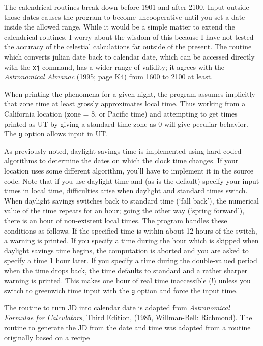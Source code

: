 The calendrical routines break down before 1901 and after 2100. Input 
outside those dates causes the program to become uncooperative until you 
set a date inside the allowed range.  While it would be a simple matter 
to extend the calendrical routines, I worry about the wisdom of this 
because I have not tested the accuracy of the celestial calculations far 
outside of the present.  The routine which converts julian date
back to calendar date, which can be accessed directly with the {\tt xj}
command, has a wider range of validity; it agrees with the {\it Astronomical
Almanac} (1995; page K4) from 1600 to 2100 at least.
\par
When printing the phenomena for a given night, the program assumes 
implicitly that zone time at least grossly approximates 
local time.  Thus working from a California location (zone = 8, or 
Pacific time) and attempting to get times printed as UT by giving a 
standard time zone as 0 will give peculiar behavior.  The {\tt g} option 
allows input in UT.
\par
As previously noted, daylight savings time is implemented using hard-coded 
algorithms to determine the dates on which the clock time changes.  If your 
location uses some different algorithm, you'll have to implement it in the 
source code.   Note that if you use daylight time and (as is the default)
specify your input times in local time, difficulties arise when daylight 
and standard times switch.  When daylight savings switches back to standard 
time (`fall back'), the numerical value of the time repeats for an hour; going the other 
way (`spring forward'), there is an hour of non-existent local times.  The program handles these 
conditions as follows.  If the specified time is within about 12 hours of 
the switch, a warning is printed.  If you specify a time during the hour 
which is skipped when daylight savings time begins, the computation is 
aborted and you are asked to specify a time 1 hour later.  If you specify 
a time during the double-valued period when the time drops back, the time 
defaults to standard and a rather sharper warning is printed.   This makes 
one hour of real time inaccessible (!) unless you switch to greenwich time 
input with the {\tt g} option and force the input time.
\par
The routine to turn JD into calendar date is adapted from {\it Astronomical
Formulae for Calculators}, Third Edition, (1985, Willman-Bell: Richmond).
The routine to generate the JD from 
the date and time was adapted from a routine originally based on a recipe 
